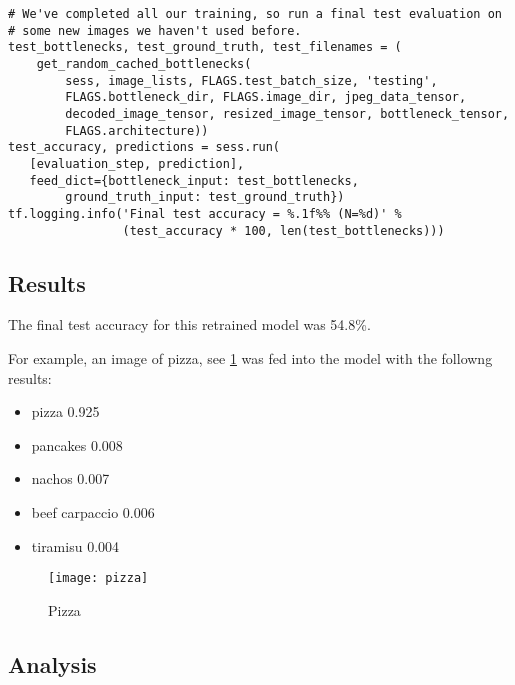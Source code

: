 \begin{lstlisting}
# We've completed all our training, so run a final test evaluation on
# some new images we haven't used before.
test_bottlenecks, test_ground_truth, test_filenames = (
    get_random_cached_bottlenecks(
        sess, image_lists, FLAGS.test_batch_size, 'testing',
        FLAGS.bottleneck_dir, FLAGS.image_dir, jpeg_data_tensor,
        decoded_image_tensor, resized_image_tensor, bottleneck_tensor,
        FLAGS.architecture))
test_accuracy, predictions = sess.run(
   [evaluation_step, prediction],
   feed_dict={bottleneck_input: test_bottlenecks,
        ground_truth_input: test_ground_truth})
tf.logging.info('Final test accuracy = %.1f%% (N=%d)' %
                (test_accuracy * 100, len(test_bottlenecks)))
\end{lstlisting}

\subsection*{Results}
The final test accuracy for this retrained model was 54.8\%.

For example, an image of pizza, see \ref{fig:pizza} was fed into the model with the followng results:
\begin{itemize}
    \item{pizza 0.925}
    \item{pancakes 0.008}
    \item{nachos 0.007}
    \item{beef carpaccio 0.006}
    \item{tiramisu 0.004}
\end{itemize}

\begin{figure}
     \texttt{[image: pizza]}
     \caption{Pizza}
     \label{fig:pizza}
\end{figure}

\subsection*{Analysis}
